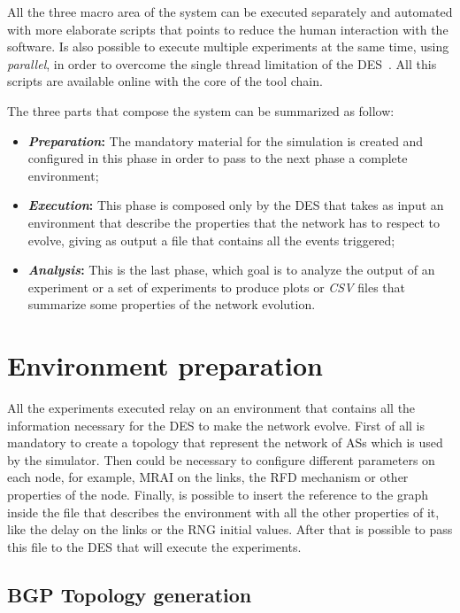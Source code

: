 All the three macro area of the system can be executed separately and automated
with more elaborate scripts that points to reduce the human interaction with the
software.
Is also possible to execute multiple experiments at the same time, using
\textit{parallel}, in order to overcome the single thread limitation of the
\ac{DES}~\cite{Tange2011a}.
All this scripts are available online with the core of the tool chain.

The three parts that compose the system can be summarized as follow:
\begin{itemize}
		\item \textbf{\textit{Preparation}:} The mandatory material for the
				simulation is created and configured in this phase in order to
				pass to the next phase a complete environment;
		\item \textbf{\textit{Execution}:} This phase is composed only by the
				\ac{DES} that takes as input an environment that describe the
				properties that the network has to respect to evolve, giving as
				output a file that contains all the events triggered;
		\item \textbf{\textit{Analysis}:} This is the last phase, which goal
				is to analyze the output of an experiment or a set of experiments
				to produce plots or \textit{CSV} files that summarize some
				properties of the network evolution.
\end{itemize}

\section{Environment preparation}
\label{sec:exp_prep}

All the experiments executed relay on an environment that contains all
the information necessary for the \ac{DES} to make the network evolve.
First of all is mandatory to create a topology that represent the network
of \acp{AS} which is used by the simulator. Then could be necessary to configure
different parameters on each node, for example, \ac{MRAI} on the links, the
\ac{RFD} mechanism or other properties of the node.
Finally, is possible to insert the reference to the graph inside the file that
describes the environment with all the other properties of it, like the delay
on the links or the \ac{RNG} initial values.
After that is possible to pass this file to the \ac{DES} that will execute
the experiments.

\subsection{BGP Topology generation}
\label{subsec:exp_topology_generation}

